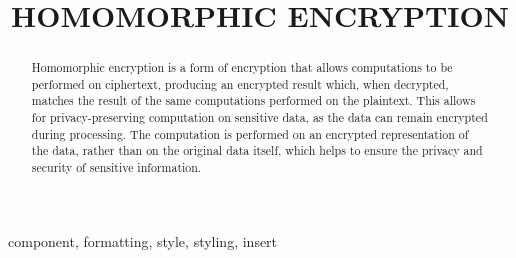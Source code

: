 \documentclass[conference]{IEEEtran}
\begin{document}
\title{HOMOMORPHIC ENCRYPTION\\


}

\author{
\and
\centering
{}
\and
}

\maketitle

\begin{abstract}
Homomorphic encryption is a form of encryption that allows computations to be performed on ciphertext, producing an encrypted result which, when decrypted, matches the result of the same computations performed on the plaintext. This allows for privacy-preserving computation on sensitive data, as the data can remain encrypted during processing. The computation is performed on an encrypted representation of the data, rather than on the original data itself, which helps to ensure the privacy and security of sensitive information.
\end{abstract}

\begin{IEEEkeywords}
component, formatting, style, styling, insert
\end{IEEEkeywords}
\end{document}
